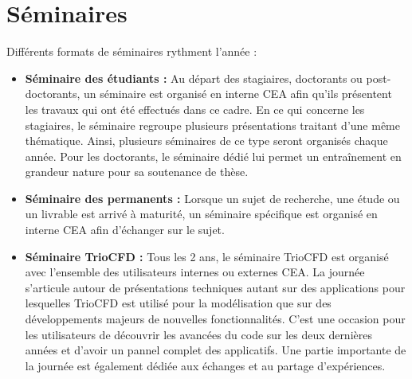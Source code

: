 \chapter{Séminaires}

Différents formats de séminaires rythment l'année :
\begin{itemize}[label=$\Rightarrow$, font=\LARGE]
\item \textbf{Séminaire des étudiants :} Au départ des stagiaires, doctorants ou post-doctorants, un séminaire est organisé en interne CEA afin qu'ils présentent les travaux qui ont été effectués dans ce cadre. En ce qui concerne les stagiaires, le séminaire regroupe plusieurs présentations traitant d'une même thématique.
Ainsi, plusieurs séminaires de ce type seront organisés chaque année. Pour les doctorants, le séminaire dédié lui permet un entra\^inement en grandeur nature pour sa soutenance de thèse.
\item \textbf{Séminaire des permanents :} Lorsque un sujet de recherche, une étude ou un livrable est arrivé à maturité, un séminaire spécifique est organisé en interne CEA afin d'échanger sur le sujet.
\item \textbf{Séminaire TrioCFD :} Tous les 2 ans, le séminaire TrioCFD est organisé avec l'ensemble des utilisateurs internes ou externes CEA. La journée s'articule autour de présentations techniques autant sur des applications pour lesquelles TrioCFD est utilisé pour la modélisation que sur des développements majeurs de nouvelles fonctionnalités. C'est une occasion pour les utilisateurs de découvrir les avancées du code sur les deux dernières années et d'avoir un pannel complet des applicatifs. Une partie importante de la journée est également dédiée aux échanges et au partage d'expériences.
\end{itemize}


